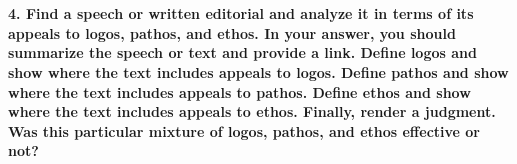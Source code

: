 \documentclass[a4paper]{article}
\begin{document}
    \section{}
        \textbf{4. Find a speech or written editorial and analyze it in terms of its appeals to logos, pathos, and ethos. In your answer, you should summarize the speech or text and provide a link. Define logos and show where the text includes appeals to logos. Define pathos and show where the text includes appeals to pathos. Define ethos and show where the text includes appeals to ethos. Finally, render a judgment. Was this particular mixture of logos, pathos, and ethos effective or not?}

        \pagebreak
        
        
        \cite{lesson9}
        \cite{williams_2021}
        \cite{lesson10}
        \cite{phuong_2016}
\end{document}
